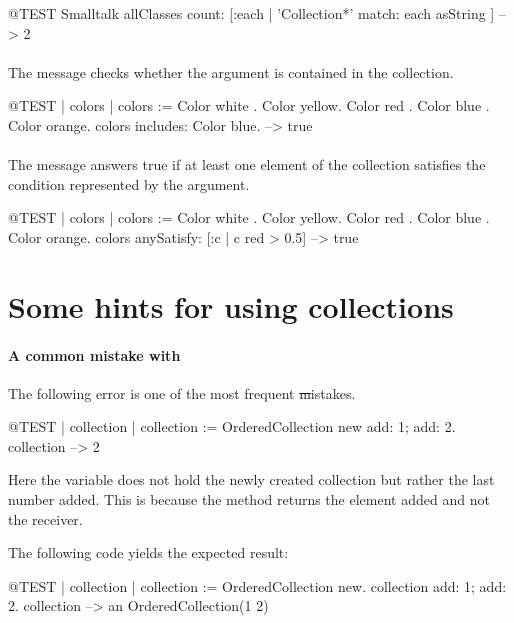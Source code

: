 \documentclass[a4paper,10pt,twoside]{book}
\begin{document}
\begin{code}{@TEST}
Smalltalk allClasses count: [:each | 'Collection*' match: each asString ] --> 2
\end{code}

\paragraph{} The message  checks whether the argument is contained in the collection. 

\begin{code}{@TEST | colors |}
colors := {Color white . Color yellow. Color red . Color blue . Color orange}.
colors includes: Color blue. --> true
\end{code}

\paragraph{} The message  answers true if at least one element of the collection satisfies the condition represented by the argument.

\begin{code}{@TEST | colors | colors := {Color white . Color yellow. Color red . Color blue . Color orange}.}
colors anySatisfy: [:c | c red > 0.5] --> true
\end{code}
\section{Some hints for using collections}

\paragraph{A common mistake with } The following error is one of the most frequent \st mistakes.

\begin{code}{@TEST | collection | }
collection := OrderedCollection new add: 1; add: 2.
collection --> 2
\end{code}
\noindent
Here the variable  does not hold the newly created collection but rather the last number added. 
This is because the method  returns the element added and not the receiver.

The following code yields the expected result:
\begin{code}{@TEST | collection |}
collection := OrderedCollection new.
collection add: 1; add: 2.
collection --> an OrderedCollection(1 2)
\end{code}
\end{document}
